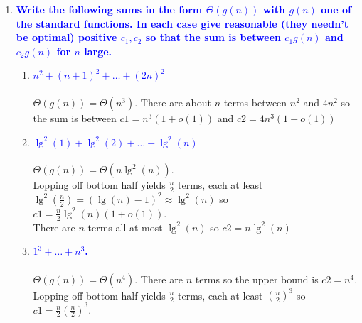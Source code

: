 \documentclass[11pt]{article}
\begin{document}
\begin{enumerate}
\item \textbf{\textcolor{blue}{Write the following sums in the form $\Theta(g(n))$ with $g(n)$
one of the standard functions. In each case give reasonable (they needn't be optimal) positive $c_1,c_2$ so that the sum is between $c_1g(n)$ and $c_2g(n)$ for $n$ large.}}
    \begin{enumerate}
    \item \textbf{\textcolor{blue}{$n^2+(n+1)^2+\ldots + (2n)^2$}}
        \\\\ $\Theta(g(n)) = \Theta(n^3)$. There are about $n$ terms between $n^2$ and $4n^2$ so the sum is between $c1 = n^3(1+o(1))$ and $c2 = 4n^3(1+o(1))$ \\
    \item \textbf{\textcolor{blue}{$\lg^2(1)+\lg^2(2)+\ldots + \lg^2(n)$}}
        \\\\ $\Theta(g(n)) = \Theta(n\lg^2(n))$.
        \\ Lopping off bottom half yields $\frac{n}{2}$ terms, each at least $\lg^2(\frac{n}{2}) = (\lg(n)-1)^2 \approx \lg^2(n)$ so $c1 = \frac{n}{2}\lg^2(n)(1 + o(1))$.
        \\ There are $n$ terms all at most $\lg^2(n)$ so $c2 = n\lg^2(n)$ \\
    \item \textbf{\textcolor{blue}{$1^3+\ldots+n^3$.}}
        \\\\ $\Theta(g(n)) = \Theta(n^4)$. There are $n$ terms so the upper bound is $c2=n^4$.
        \\ Lopping off bottom half yields $\frac{n}{2}$ terms, each at least $(\frac{n}{2})^3$ so $c1 = \frac{n}{2}(\frac{n}{2})^3$. \\
    \end{enumerate}



\end{enumerate}
\end{document}
